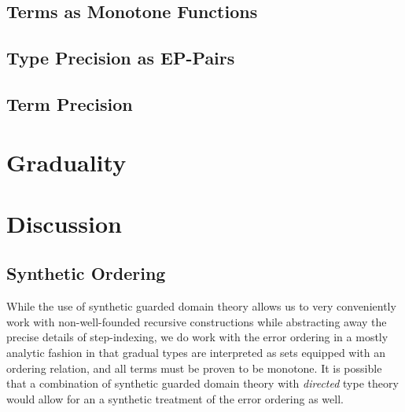 \documentclass[acmsmall,screen]{acmart}
\begin{document}
\subsection{Terms as Monotone Functions}

\subsection{Type Precision as EP-Pairs}

\subsection{Term Precision}


\section{Graduality}\label{sec:graduality}



\section{Discussion}\label{sec:discussion}

\subsection{Synthetic Ordering}

While the use of synthetic guarded domain theory allows us to very
conveniently work with non-well-founded recursive constructions while
abstracting away the precise details of step-indexing, we do work with
the error ordering in a mostly analytic fashion in that gradual types
are interpreted as sets equipped with an ordering relation, and all
terms must be proven to be monotone.
%
It is possible that a combination of synthetic guarded domain theory
with \emph{directed} type theory would allow for an a synthetic
treatment of the error ordering as well.
\end{document}
